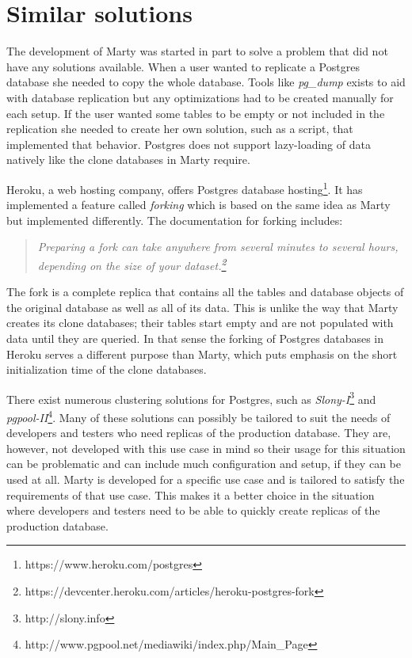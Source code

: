 \section{Similar solutions}
The development of Marty was started in part to solve a problem that did not have any solutions available.
When a user wanted to replicate a Postgres database she needed to copy the whole database.
Tools like \textit{pg\_dump} exists to aid with database replication but any optimizations had to be created manually for each setup.
If the user wanted some tables to be empty or not included in the replication she needed to create her own solution, such as a script, that implemented that behavior.
Postgres does not support lazy-loading of data natively like the clone databases in Marty require.

Heroku, a web hosting company, offers Postgres database hosting\footnote{https://www.heroku.com/postgres}.
It has implemented a feature called \textit{forking} which is based on the same idea as Marty but implemented differently.
The documentation for forking includes:

\begin{quote}
\textit{Preparing a fork can take anywhere from several minutes to several hours, depending on the size of your dataset.\footnote{https://devcenter.heroku.com/articles/heroku-postgres-fork}}
\end{quote}

The fork is a complete replica that contains all the tables and database objects of the original database as well as all of its data.
This is unlike the way that Marty creates its clone databases; their tables start empty and are not populated with data until they are queried.
In that sense the forking of Postgres databases in Heroku serves a different purpose than Marty, which puts emphasis on the short initialization time of the clone databases.

There exist numerous clustering solutions for Postgres, such as \textit{Slony-I}\footnote{http://slony.info} and \textit{pgpool-II}\footnote{http://www.pgpool.net/mediawiki/index.php/Main\_Page}.
Many of these solutions can possibly be tailored to suit the needs of developers and testers who need replicas of the production database.
They are, however, not developed with this use case in mind so their usage for this situation can be problematic and can include much configuration and setup, if they can be used at all.
Marty is developed for a specific use case and is tailored to satisfy the requirements of that use case.
This makes it a better choice in the situation where developers and testers need to be able to quickly create replicas of the production database.

